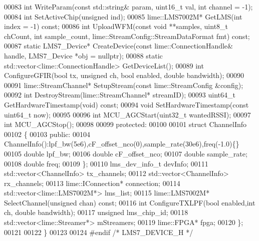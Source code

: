 \begin{DoxyCode}
00083     \textcolor{keywordtype}{int} WriteParam(\textcolor{keyword}{const} std::string& param, uint16\_t val, \textcolor{keywordtype}{int} channel = -1);
00084     \textcolor{keywordtype}{int} SetActiveChip(\textcolor{keywordtype}{unsigned} ind);
00085     lime::LMS7002M* GetLMS(\textcolor{keywordtype}{int} index = -1) \textcolor{keyword}{const};
00086     \textcolor{keywordtype}{int} UploadWFM(\textcolor{keyword}{const} \textcolor{keywordtype}{void} **samples, uint8\_t chCount, \textcolor{keywordtype}{int} sample_count, 
      lime::StreamConfig::StreamDataFormat fmt) \textcolor{keyword}{const};
00087     \textcolor{keyword}{static} LMS7_Device* CreateDevice(\textcolor{keyword}{const} lime::ConnectionHandle& handle, 
      LMS7_Device *obj = \textcolor{keyword}{nullptr});
00088     \textcolor{keyword}{static} std::vector<lime::ConnectionHandle> GetDeviceList();
00089     \textcolor{keywordtype}{int} ConfigureGFIR(\textcolor{keywordtype}{bool} tx, \textcolor{keywordtype}{unsigned} ch, \textcolor{keywordtype}{bool} enabled, \textcolor{keywordtype}{double} bandwidth);
00090 
00091     lime::StreamChannel* SetupStream(\textcolor{keyword}{const} lime::StreamConfig &config);
00092     \textcolor{keywordtype}{int} DestroyStream(lime::StreamChannel* streamID);
00093     uint64\_t GetHardwareTimestamp(\textcolor{keywordtype}{void}) \textcolor{keyword}{const};
00094     \textcolor{keywordtype}{void} SetHardwareTimestamp(\textcolor{keyword}{const} uint64\_t now);
00095 
00096     \textcolor{keywordtype}{int} MCU\_AGCStart(uint32\_t wantedRSSI);
00097     \textcolor{keywordtype}{int} MCU\_AGCStop();
00098 
00099 \textcolor{keyword}{protected}:
00100 
00101     \textcolor{keyword}{struct }ChannelInfo
00102     \{
00103     \textcolor{keyword}{public}:
00104         ChannelInfo():lpf\_bw(5e6),cF\_offset\_nco(0),sample\_rate(30e6),freq(-1.0)\{\}
00105         \textcolor{keywordtype}{double} lpf_bw;
00106         \textcolor{keywordtype}{double} cF_offset_nco;
00107         \textcolor{keywordtype}{double} sample_rate;
00108         \textcolor{keywordtype}{double} freq;
00109     \};
00110     lms_dev_info_t devInfo;
00111     std::vector<ChannelInfo> tx_channels;
00112     std::vector<ChannelInfo> rx_channels;
00113     lime::IConnection* connection;
00114     std::vector<lime::LMS7002M*> lms_list;
00115     lime::LMS7002M* SelectChannel(\textcolor{keywordtype}{unsigned} chan) \textcolor{keyword}{const};
00116     \textcolor{keywordtype}{int} ConfigureTXLPF(\textcolor{keywordtype}{bool} enabled,\textcolor{keywordtype}{int} ch, \textcolor{keywordtype}{double} bandwidth);
00117     \textcolor{keywordtype}{unsigned} lms_chip_id;
00118     std::vector<lime::Streamer*> mStreamers;
00119     lime::FPGA* fpga;
00120 \};
00121 
00122 \}
00123 
00124 \textcolor{preprocessor}{#endif  }\textcolor{comment}{/* LMS7\_DEVICE\_H */}\textcolor{preprocessor}{}
\end{DoxyCode}
